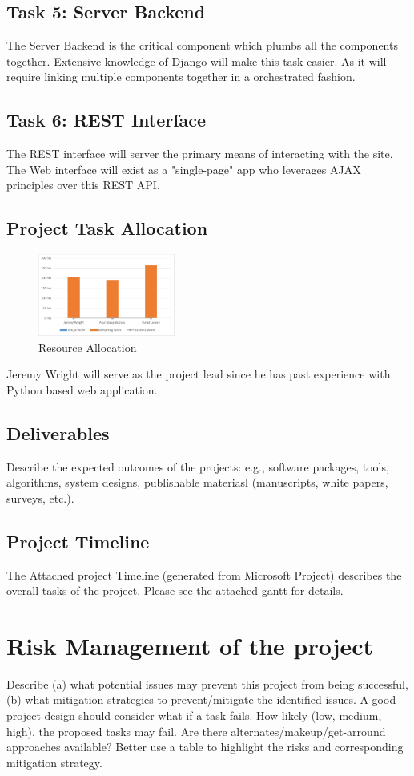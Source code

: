 \documentclass[conference,12pt]{IEEEtran}
\begin{document}
\subsection{Task 5: Server Backend}
The Server Backend is the critical component which plumbs all the components
together. Extensive knowledge of Django will make this task easier. As it will
require linking multiple components together in a orchestrated fashion.
\subsection{Task 6: REST Interface}
The REST interface will server the primary means of interacting with the site.
The Web interface will exist as a "single-page" app who leverages AJAX
principles over this REST API. 
\subsection{Project Task Allocation}

\begin{figure}
\centering
\includegraphics[width=0.4\textwidth]{ResourceAllocation.pdf}
\caption{Resource Allocation}
\label{fig:resourceallocation}
\end{figure}
Jeremy Wright will serve as the project lead since he has past experience with
Python based web application. 
\subsection{Deliverables}
Describe the expected outcomes of the projects: e.g., software packages, tools, algorithms, system designs, publishable materiasl (manuscripts, white papers, surveys, etc.).
\subsection{Project Timeline}
The Attached project Timeline (generated from Microsoft Project) describes the
overall tasks of the project. Please see the attached gantt for details.
\section{Risk Management of the project}
Describe (a) what potential issues may prevent this project from being successful, (b) what mitigation strategies to prevent/mitigate the identified issues. A good project design should consider what if a task fails. How likely (low, medium, high), the proposed tasks may fail. Are there alternates/makeup/get-arround approaches available? Better use  a table to highlight the risks and corresponding mitigation strategy.
\end{document}
